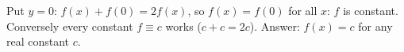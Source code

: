 Put $y=0$: $f(x)+f(0)=2f(x)$, so $f(x)=f(0)$ for all $x$: $f$ is constant. Conversely every constant $f\equiv c$ works ($c+c=2c$). Answer: $\boxed{f(x)=c}$ for any real constant $c$.
